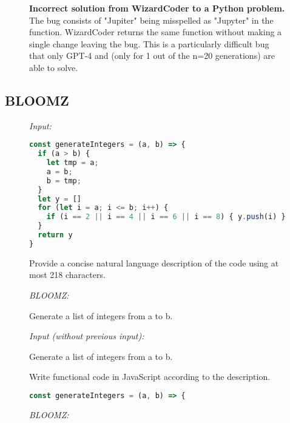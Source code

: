 \begin{figure}[htbp]
\hrulefill
\caption{\textbf{Incorrect solution from WizardCoder to a \evalf{} Python problem.} The bug consists of "Jupiter" being misspelled as "Jupyter" in the function. WizardCoder returns the same function without making a single change leaving the bug. This is a particularly difficult bug that only GPT-4 and \model{} (only for 1 out of the n=20 generations) are able to solve. }
\label{fig:wizardcoderpy}
\end{figure}

\FloatBarrier
\newpage

\subsection{BLOOMZ}
\label{sec:examplesbloomz}


\begin{figure}[htbp]
\hrulefill

\emph{Input:}

\hrulefill

\begin{lstlisting}[language=JavaScript,breaklines=true,basicstyle=\ttfamily\scriptsize]
const generateIntegers = (a, b) => {
  if (a > b) {
    let tmp = a;
    a = b;
    b = tmp;
  }
  let y = []
  for (let i = a; i <= b; i++) {
    if (i == 2 || i == 4 || i == 6 || i == 8) { y.push(i) }
  }
  return y
}
\end{lstlisting}

Provide a concise natural language description of the code using at most 218 characters.

\hrulefill

\emph{BLOOMZ:}

\hrulefill

Generate a list of integers from a to b.

\hrulefill

\emph{Input (without previous input):}

\hrulefill

Generate a list of integers from a to b.

Write functional code in JavaScript according to the description.
\begin{lstlisting}[language=JavaScript,breaklines=true,basicstyle=\ttfamily\scriptsize]
const generateIntegers = (a, b) => {
\end{lstlisting}

\hrulefill

\emph{BLOOMZ:}

\hrulefill


\end{figure}
